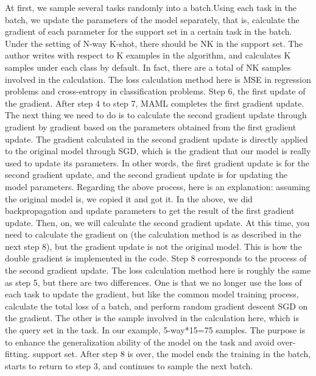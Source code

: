 At first, we sample several tasks randomly into a batch.Using each task in the batch, we update the parameters of the model separately, that is, calculate the gradient of each parameter for the support set in a certain task in the batch. Under the setting of N-way K-shot, there should be NK in the support set. The author writes with respect to K examples in the algorithm, and calculates K samples under each class by default. In fact, there are a total of NK samples involved in the calculation. The loss calculation method here is MSE in regression problems and cross-entropy in classification problems. Step 6, the first update of the gradient. After step 4 to step 7, MAML completes the first gradient update. The next thing we need to do is to calculate the second gradient update through gradient by gradient based on the parameters obtained from the first gradient update. The gradient calculated in the second gradient update is directly applied to the original model through SGD, which is the gradient that our model is really used to update its parameters. In other words, the first gradient update is for the second gradient update, and the second gradient update is for updating the model parameters. Regarding the above process, here is an explanation: assuming the original model is, we copied it and got it. In the above, we did backpropagation and update parameters to get the result of the first gradient update. Then, on, we will calculate the second gradient update. At this time, you need to calculate the gradient on (the calculation method is as described in the next step 8), but the gradient update is not the original model. This is how the double gradient is implemented in the code. Step 8 corresponds to the process of the second gradient update. The loss calculation method here is roughly the same as step 5, but there are two differences. One is that we no longer use the loss of each task to update the gradient, but like the common model training process, calculate the total loss of a batch, and perform random gradient descent SGD on the gradient. The other is the sample involved in the calculation here, which is the query set in the task. In our example, 5-way*15=75 samples. The purpose is to enhance the generalization ability of the model on the task and avoid over-fitting. support set. After step 8 is over, the model ends the training in the batch, starts to return to step 3, and continues to sample the next batch.
